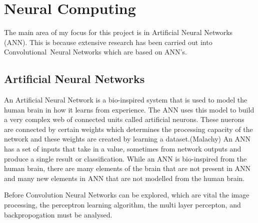 \section{Neural Computing}
The main area of my focus for this project is in
Artificial Neural Networks (ANN). This is because extensive research has been carried out into Convolutional Neural Networks which are based on ANN's.
\subsection*{Artificial Neural Networks}
An Artificial Neural Network is a bio-inspired system that is used to model the human brain in how it learns from experience.
The ANN uses this model to build a very complex web of connected units called
artificial neurons.
These nuerons are connected by certain weights which determines the processing
capacity of the network and these weights are created by learning a
dataset.(Malachy)
An ANN has a set of inputs that take in a value, sometimes from network outputs
and produce a single result or classification.
While an ANN is bio-inspired from the human brain, there are many elements of
the brain that are not present in ANN and many new elements in ANN that are not
modelled from the human brain.

Before Convolution Neural Networks can be explored, which are vital the image
processing, the perceptron learning algorithm, the multi
layer percepton, and backpropogation must be analysed.



